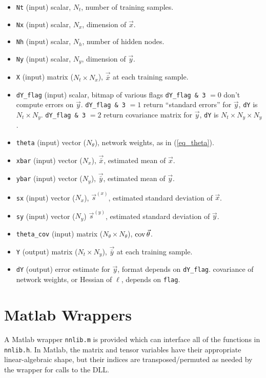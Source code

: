 \documentclass{article}    %
\newcommand{\cov}{\mathop{{\rm cov}}}
\begin{document}
\begin{itemize}
\item \verb|Nt| (input) scalar, $N_t$, number of training samples.
\item \verb|Nx| (input) scalar, $N_x$, dimension of $\vec{x}$.
\item \verb|Nh| (input) scalar, $N_h$, number of hidden nodes.
\item \verb|Ny| (input) scalar, $N_y$, dimension of $\vec{y}$.
\item \verb|X| (input) matrix ($N_t \times N_x$), $\vec{\bar{x}}$ at each training sample.
\item \verb|dY_flag| (input) scalar, bitmap of various flags
  \subitem \verb|dY_flag & 3| $=0$ don't compute errors on $\vec{y}$.
  \subitem \verb|dY_flag & 3| $=1$ return ``standard errors'' for $\vec{y}$, \verb|dY| is $N_t \times N_y$.
  \subitem \verb|dY_flag & 3| $=2$ return covariance matrix for $\vec{y}$, \verb|dY| is $N_t \times N_y \times N_y$.
\item \verb|theta| (input) vector ($N_{\theta}$), network weights, as in (\ref{eq_theta}).
\item \verb|xbar| (input) vector ($N_x$), $\vec{\bar{x}}$, estimated mean of $\vec{x}$.
\item \verb|ybar| (input) vector ($N_y$), $\vec{\bar{y}}$, estimated mean of $\vec{y}$.
\item \verb|sx| (input) vector ($N_x$), $\vec{s}^{(x)}$, estimated standard deviation of $\vec{x}$.
\item \verb|sy| (input) vector ($N_y$) $\vec{s}^{(y)}$, estimated standard deviation of $\vec{y}$.
\item \verb|theta_cov| (input) matrix ($N_{\theta} \times N_{\theta}$), $\cov\vec\theta$.
\item \verb|Y| (output) matrix ($N_t \times N_y$), $\vec{\bar{y}}$ at each training sample.
\item \verb|dY| (output) error estimate for $\vec{y}$, format depends on \verb|dY_flag|.
  covariance of network weights, or Hessian of $\ell$, depends on \verb|flag|. 
\end{itemize}

\section{Matlab Wrappers}
A Matlab wrapper \verb|nnlib.m| is provided which can interface all of
the functions in \verb|nnlib.h|. In Matlab, the matrix and tensor variables
have their appropriate linear-algebraic shape, but their indices are
transposed/permuted as needed by the wrapper for calls to the DLL.
\end{document}
